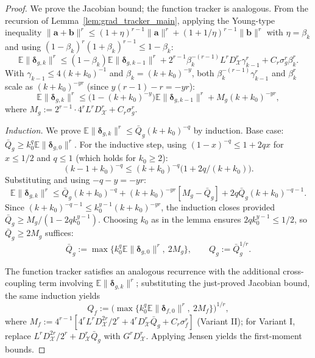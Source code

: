 \documentclass[10pt,a4paper]{amsart}
\def\va{{\bm{a}}}
\def\vb{{\bm{b}}}
\newcommand{\E}{\mathbb{E}}
\newcommand{\cX}{\mathcal{X}}
\begin{document}
\begin{proof}
We prove the Jacobian bound; the function tracker is analogous. From the recursion of Lemma~\ref{lem:grad_tracker_main}, applying the Young-type inequality $\|\va + \vb\|^r \le (1+\eta)^{r-1}\|\va\|^r + (1+1/\eta)^{r-1}\|\vb\|^r$ with $\eta = \beta_k$ and using $(1-\beta_k)^r(1+\beta_k)^{r-1} \le 1-\beta_k$:
\[
\E\|\bm\delta_{g,k}\|^r \le (1-\beta_k)\E\|\bm\delta_{g,k-1}\|^r + 2^{r-1}\beta_k^{-(r-1)} L^r D_\cX^r \gamma_{k-1}^r + C_r \sigma_g^r \beta_k^r.
\]
With $\gamma_{k-1} \le 4(k+k_0)^{-1}$ and $\beta_k = (k+k_0)^{-y}$, both $\beta_k^{-(r-1)}\gamma_{k-1}^r$ and $\beta_k^r$ scale as $(k+k_0)^{-yr}$ (since $y(r-1) - r = -yr$):
\begin{equation}\label{eq:convex_recur_clean}
\E\|\bm\delta_{g,k}\|^r \le \big(1 - (k+k_0)^{-y}\big)\E\|\bm\delta_{g,k-1}\|^r + M_g (k+k_0)^{-yr},
\end{equation}
where $M_g := 2^{r-1}\cdot 4^r L^r D_\cX^r + C_r \sigma_g^r$.

\emph{Induction.} We prove $\E\|\bm\delta_{g,k}\|^r \le \bar Q_g(k+k_0)^{-q}$ by induction. Base case: $\bar Q_g \ge k_0^q \E\|\bm\delta_{g,0}\|^r$. For the inductive step, using $(1-x)^{-q} \le 1 + 2qx$ for $x \le 1/2$ and $q \le 1$ (which holds for $k_0 \ge 2$):
\[
(k-1+k_0)^{-q} \le (k+k_0)^{-q}\big(1 + 2q/(k+k_0)\big).
\]
Substituting and using $-q-y = -yr$:
\[
\E\|\bm\delta_{g,k}\|^r \le \bar Q_g(k+k_0)^{-q} + (k+k_0)^{-yr}[M_g - \bar Q_g] + 2q\bar Q_g(k+k_0)^{-q-1}.
\]
Since $(k+k_0)^{-q-1} \le k_0^{y-1}(k+k_0)^{-yr}$, the induction closes provided $\bar Q_g \ge M_g/(1 - 2q k_0^{y-1})$. Choosing $k_0$ as in the lemma ensures $2qk_0^{y-1} \le 1/2$, so $\bar Q_g \ge 2 M_g$ suffices:
\begin{equation} \label{eq:Qg_explicit}
\bar Q_g := \max\{k_0^q \E\|\bm\delta_{g,0}\|^r,\ 2 M_g\}, \qquad Q_g := \bar Q_g^{1/r}.
\end{equation}

The function tracker satisfies an analogous recurrence with the additional cross-coupling term involving $\E\|\bm\delta_{g,k}\|^r$; substituting the just-proved Jacobian bound, the same induction yields
\begin{equation} \label{eq:Qf_explicit}
Q_f := \big(\max\{k_0^q \E\|\bm\delta_{f,0}\|^r,\ 2 M_f\}\big)^{1/r},
\end{equation}
where $M_f := 4^{r-1}[4^r L^r D_\cX^{2r}/2^r + 4^r D_\cX^r \bar Q_g + C_r \sigma_f^r]$ (Variant II); for Variant I, replace $L^r D_\cX^{2r}/2^r + D_\cX^r \bar Q_g$ with $G^r D_\cX^r$. Applying Jensen yields the first-moment bounds.
\end{proof}
\end{document}
